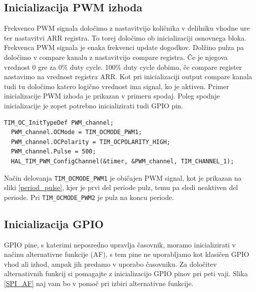 \documentclass[12pt,letterpaper]{article}
\begin{document}
\subsection*{Inicializacija PWM izhoda}

Frekvenco PWM signala določimo z nastavitvijo količnika v delilniku vhodne ure ter nastavitvi ARR registra. To torej določimo ob inicializaciji osnovnega bloka. Frekvenca PWM signala je enaka frekvenci update dogodkov. Dolžino pulza pa določimo v compare kanalu z nastavitvijo compare registra. Če je njegova vrednost 0 gre za 0\% duty cycle. 100\% duty cycle dobimo, če compare register nastavimo na vrednost registra ARR. Kot pri inicializaciji output compare kanala tudi tu določimo katero logično vrednost ima signal, ko je aktiven. Primer inicializacije PWM izhoda je prikazan v primeru spodaj. Poleg spodnje inicializacije je zopet potrebno inicializirati tudi GPIO pin.

\begin{center}
\begin{lstlisting}[style=CStyle]
  TIM_OC_InitTypeDef PWM_channel;
  PWM_channel.OCMode = TIM_OCMODE_PWM1;
  PWM_channel.OCPolarity = TIM_OCPOLARITY_HIGH;
  PWM_channel.Pulse = 500;
  HAL_TIM_PWM_ConfigChannel(&timer, &PWM_channel, TIM_CHANNEL_1);
\end{lstlisting}
\end{center}

Način delovanja \texttt{TIM\_OCMODE\_PWM1} je običajen PWM signal, kot je prikazan na sliki \ref{period_pulse}, kjer je prvi del periode pulz, temu pa sledi neaktiven del periode. Pri \texttt{TIM\_OCMODE\_PWM2} je pulz na koncu periode.

\subsection*{Inicializacija GPIO}

GPIO pine, s katerimi neposredno upravlja časovnik, moramo inicializirati v načinu alternativne funkcije (AF), s tem pine ne uporabljamo kot klasičen GPIO vhod ali izhod, ampak jih predamo v uporabo časovniku. Za določitev alternativnih funkcij si pomagajte z inicializacijo GPIO pinov pri peti vaji. Slika \ref{SPI_AF} naj vam bo v pomoč pri izbiri alternativne funkcije.
\end{document}
